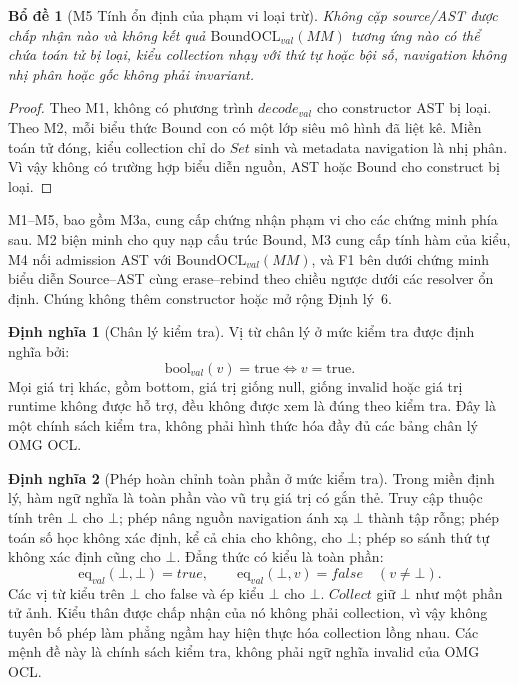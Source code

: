 \documentclass[11pt,a4paper]{article}
\newtheorem{lemma}{Bổ đề}
\theoremstyle{definition}
\newtheorem{definition}{Định nghĩa}
\newcommand{\BoundOCLval}{\mathrm{BoundOCL}_{val}}
\newcommand{\boolval}{\mathrm{bool}_{val}}
\newcommand{\eqval}{\mathrm{eq}_{val}}
\begin{document}
\begin{lemma}[M5 Tính ổn định của phạm vi loại trừ]
Không cặp source/AST được chấp nhận nào và không kết quả
$\BoundOCLval(MM)$ tương ứng nào có thể chứa toán tử bị loại, kiểu collection
nhạy với thứ tự hoặc bội số, navigation không nhị phân hoặc gốc không phải invariant.
\end{lemma}
\begin{proof}
Theo M1, không có phương trình $decode_{val}$ cho constructor AST bị loại. Theo
M2, mỗi biểu thức Bound con có một lớp siêu mô hình đã liệt kê. Miền toán tử
đóng, kiểu collection chỉ do $Set$ sinh và metadata navigation là nhị phân.
Vì vậy không có trường hợp biểu diễn nguồn, AST hoặc Bound cho construct bị loại.
\end{proof}

M1--M5, bao gồm M3a, cung cấp chứng nhận phạm vi cho các chứng minh phía sau. M2 biện minh cho
quy nạp cấu trúc Bound, M3 cung cấp tính hàm của kiểu, M4 nối admission AST với
$\BoundOCLval(MM)$, và F1 bên dưới chứng minh biểu diễn Source--AST cùng erase--rebind theo
chiều ngược dưới các resolver ổn định. Chúng không thêm constructor hoặc mở
rộng Định lý~6.

\begin{definition}[Chân lý kiểm tra]
Vị từ chân lý ở mức kiểm tra được định nghĩa bởi:
\[
\boolval(v)=\mathrm{true} \iff v=\mathrm{true}.
\]
Mọi giá trị khác, gồm bottom, giá trị giống null, giống invalid hoặc giá trị
runtime không được hỗ trợ, đều không được xem là đúng theo kiểm tra. Đây là một
chính sách kiểm tra, không phải hình thức hóa đầy đủ các bảng chân lý OMG OCL.
\end{definition}

\begin{definition}[Phép hoàn chỉnh toàn phần ở mức kiểm tra]
Trong miền định lý, hàm ngữ nghĩa là toàn phần vào vũ trụ giá trị có gắn thẻ.
Truy cập thuộc tính trên $\bot$ cho $\bot$; phép nâng nguồn navigation ánh xạ
$\bot$ thành tập rỗng; phép toán số học không xác định, kể cả chia cho không,
cho $\bot$; phép so sánh thứ tự không xác định cũng cho $\bot$. Đẳng thức có
kiểu là toàn phần:
\[
\eqval(\bot,\bot)=true,
\qquad
\eqval(\bot,v)=false\quad(v\neq\bot).
\]
Các vị từ kiểu trên $\bot$ cho false và ép kiểu $\bot$ cho $\bot$.
$Collect$ giữ $\bot$ như một phần tử ảnh. Kiểu thân được chấp nhận của nó không
phải collection, vì vậy không tuyên bố phép làm phẳng ngầm hay hiện thực hóa
collection lồng nhau. Các mệnh đề này là chính sách kiểm tra, không phải ngữ
nghĩa invalid của OMG OCL.
\end{definition}
\end{document}
